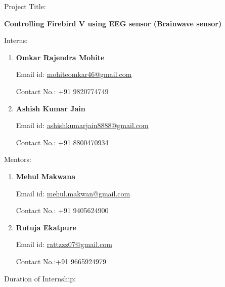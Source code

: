 \documentclass[14pt]{article}
\author{Omkar Mohite}
\title{}
\begin{document}
\begin{center}
{\Large Project Title:}
\end{center}

\begin{center}
{\Huge \textbf{Controlling Firebird V using EEG sensor (Brainwave sensor)}\\}
\end{center}

\begin{center}

\end{center}
\begin{center}
{\LARGE Interns:}

\begin{enumerate}
	\item {\LARGE \textbf{Omkar Rajendra Mohite}}


{\raggedright
{\Large Email id:
\href{mailto:mohiteomkar46@gmail.com}{mohiteomkar46@gmail.com}}
}

{\raggedright
{\Large Contact No.: +91 9820774749}
}


	\item {\LARGE \textbf{Ashish Kumar Jain}}


{\raggedright
{\Large Email id:
\href{mailto:ashishkumarjain8888@gmail.com}{ashishkumarjain8888@gmail.com}}
}


{\raggedright
{\Large Contact No.: +91 8800470934}
}
\end{enumerate}
\begin{center}
{\LARGE Mentors:}
\end{center}

\begin{enumerate}
	\item {\LARGE     \textbf{Mehul Makwana}}


{\raggedright
{\Large     Email id:
\href{mailto:mehul.makwan@gmail.com}{mehul.makwan@gmail.com}}
}

{\raggedright
{\Large     Contact No.: +91 9405624900}
}


	\item {\LARGE     \textbf{Rutuja Ekatpure}}


{\raggedright
{\LARGE     }{\Large Email id: \href{mailto:rattzzz07@gmail.com}{rattzzz07@gmail.com}}
}

{\raggedright
{\Large     Contact No.:+91 9665924979}
}
\end{enumerate}
\end{center}
\begin{center}
{\large Duration of Internship:}
\end{center}
\end{document}
